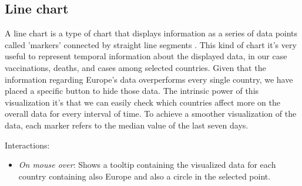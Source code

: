 \documentclass[10pt,conference]{IEEEtran}
\begin{document}
\begin{figure}
\end{figure}

\subsection{Line chart}
A line chart is a type of chart that displays information as a series of data points called ’markers’ connected by straight 
line segments \cite{line}. This kind of chart it’s very useful to represent temporal information about the displayed data,
in our case vaccinations, deaths, and cases among selected countries. Given that the information regarding Europe's data 
overperforms every single country, we have placed a specific button to hide those data. The intrinsic power of this visualization it’s 
that we can easily check which countries affect more on the overall data for every interval of time.
To achieve a smoother visualization of the data, each marker refers to the median value of the last seven days.

Interactions:
\begin{itemize}
 \item {\em On mouse over}: Shows a tooltip containing the visualized data for each country containing also Europe and also a circle in the selected point.
\end{itemize}
\end{document}
